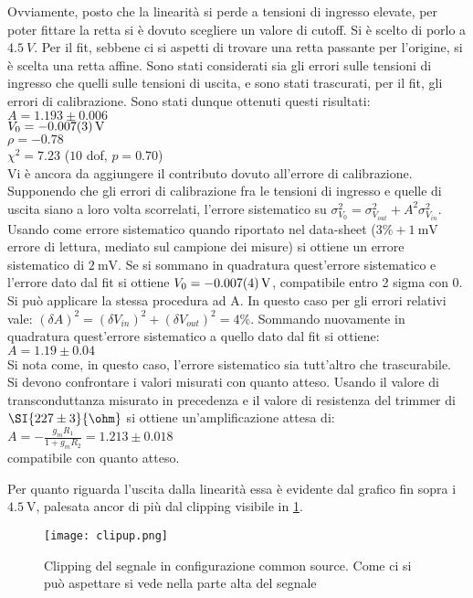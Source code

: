Ovviamente, posto che la linearità si perde a tensioni di ingresso elevate, per poter fittare la retta si è dovuto scegliere un valore di cutoff. Si è scelto di porlo a $\SI{4.5}{V}$. Per il fit, sebbene ci si aspetti di trovare una retta passante per l'origine, si è scelta una retta affine. Sono stati considerati sia gli errori sulle tensioni di ingresso che quelli sulle tensioni di uscita, e sono stati trascurati, per il fit, gli errori di calibrazione.
Sono stati dunque ottenuti questi risultati:\\
$A=1.193\pm 0.006$\\
$V_0=\SI{-0.007 \pm 0.003}{V} $\\
$\rho=-0.78$\\
$\chi^2=7.23$ ($10$ dof, $p = 0.70$)\\
Vi è ancora da aggiungere il contributo dovuto all'errore di calibrazione. Supponendo che gli errori di calibrazione fra le tensioni di ingresso e quelle di uscita siano a loro volta scorrelati, l'errore sistematico su $\sigma_{V_{0}}^2=\sigma_{V_{out}}^2+A^2\sigma_{V_{in}}^2$. Usando come errore sistematico quando riportato nel data-sheet ($3\%+\SI{1}{\mV}$ errore di lettura, mediato sul campione dei misure) si ottiene un errore sistematico di $\SI{2}{\mV}$. Se si sommano in quadratura quest'errore sistematico e l'errore dato dal fit si ottiene $V_0=\SI{-0.007 \pm 0.004}{V}$, compatibile entro 2 sigma con 0.
Si può applicare la stessa procedura ad A. In questo caso per gli errori relativi vale:
$(\delta A)^2=(\delta V_{in})^2+(\delta V_{out})^2=4 \% $. Sommando nuovamente in quadratura quest'errore sistematico a quello dato dal fit si ottiene:\\
$A=1.19\pm 0.04$\\
Si nota come, in questo caso, l'errore sistematico sia tutt'altro che trascurabile.\\ 
Si devono confrontare i valori misurati con quanto atteso. Usando il valore di transconduttanza misurato in precedenza e il valore di resistenza del trimmer di $\SI{227\pm 3}{\ohm}$ si ottiene un'amplificazione attesa di:
$A=-\frac{g_mR_1}{1+g_mR_2}= 1.213\pm 0.018$\\
compatibile con quanto atteso.

Per quanto riguarda l'uscita dalla linearità essa è evidente dal grafico fin sopra i $\SI{4.5}{\V}$, palesata ancor di più dal clipping visibile in \ref{f:CLICS}.

\begin{figure}[h]
	\centering
	\texttt{[image: clipup.png]}
	\caption{Clipping del segnale in configurazione common source. Come ci si può aspettare si vede nella parte alta del segnale}
	\label{f:CLICS}
\end{figure}



